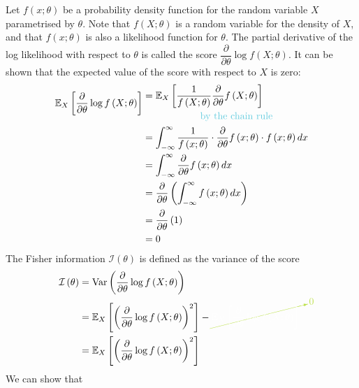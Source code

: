 \documentclass[11pt]{report} %
\begin{document}
Let $f\left(x;\theta\right)$ be a probability density function for the random variable $X$ parametrised by $\theta$. Note that $f\left(X; \theta\right)$ is a random variable for the density of $X$, and that $f\left(x;\theta\right)$ is also a likelihood function for $\theta$. The partial derivative of the log likelihood with respect to $\theta$ is called the score $\dfrac{\partial}{\partial \theta}\log f\left(X;\theta\right)$. It can be shown that the expected value of the score with respect to $X$ is zero:
\begin{align}
\mathbb{E}_{X}\left[\dfrac{\partial}{\partial \theta}\log f\left(X;\theta\right)\right] & \begin{multlined}= \mathbb{E}_{X}\left[\dfrac{1}{f\left(X;\theta\right)}\dfrac{\partial}{\partial \theta}f\left(X;\theta\right)\right] \\
\text{\blue by the chain rule\black}
\end{multlined} \\
&= \int_{-\infty}^{\infty}\dfrac{1}{f\left(x;\theta\right)}\cdot\dfrac{\partial}{\partial \theta}f\left(x;\theta\right)\cdot f\left(x;\theta\right) dx \\
&= \int_{-\infty}^{\infty}\dfrac{\partial}{\partial \theta}f\left(x;\theta\right) dx \\
&= \dfrac{\partial}{\partial \theta}\left(\int_{-\infty}^{\infty}f\left(x;\theta\right) dx\right) \\
&= \dfrac{\partial}{\partial \theta}\left(1\right) \\
&= 0
\end{align}
The Fisher information $\mathcal{I}\left(\theta\right)$ is defined as the variance of the score
\begin{align}
\mathcal{I}\left(\theta\right) &= \operatorname{Var}\left(\dfrac{\partial}{\partial \theta}\log f\left(X;\theta\right)\right) \\
&= \mathbb{E}_{X}\left[\left(\dfrac{\partial}{\partial \theta}\log f\left(X;\theta\right)\right)^{2}\right] - \green\cancelto{0}{\black\mathbb{E}_{X}\left[\dfrac{\partial}{\partial \theta}\log f\left(X;\theta\right)\right]^{2}} \\
&= \mathbb{E}_{X}\left[\left(\dfrac{\partial}{\partial \theta}\log f\left(X;\theta\right)\right)^{2}\right]
\end{align}
We can show that
\end{document}
